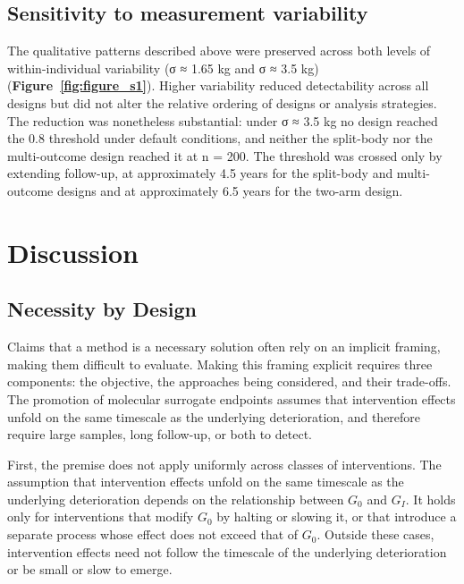 \documentclass[twocolumn]{article} %
\begin{document}
\subsection{Sensitivity to measurement variability}

The qualitative patterns described above were preserved across both levels of within-individual variability (σ ≈ 1.65 kg and σ ≈ 3.5 kg) (\textbf{Figure~\ref{fig:figure_s1}}). Higher variability reduced detectability across all designs but did not alter the relative ordering of designs or analysis strategies. The reduction was nonetheless substantial: under σ ≈ 3.5 kg no design reached the 0.8 threshold under default conditions, and neither the split-body nor the multi-outcome design reached it at n = 200. The threshold was crossed only by extending follow-up, at approximately 4.5 years for the split-body and multi-outcome designs and at approximately 6.5 years for the two-arm design.

\section{Discussion}

\subsection{Necessity by Design}

Claims that a method is a necessary solution often rely on an implicit framing, making them difficult to evaluate. Making this framing explicit requires three components: the objective, the approaches being considered, and their trade-offs. The promotion of molecular surrogate endpoints assumes that intervention effects unfold on the same timescale as the underlying deterioration, and therefore require large samples, long follow-up, or both to detect.

First, the premise does not apply uniformly across classes of interventions. The assumption that intervention effects unfold on the same timescale as the underlying deterioration depends on the relationship between $G_0$ and $G_I$. It holds only for interventions that modify $G_0$ by halting or slowing it, or that introduce a separate process whose effect does not exceed that of $G_0$. Outside these cases, intervention effects need not follow the timescale of the underlying deterioration or be small or slow to emerge.
\end{document}

